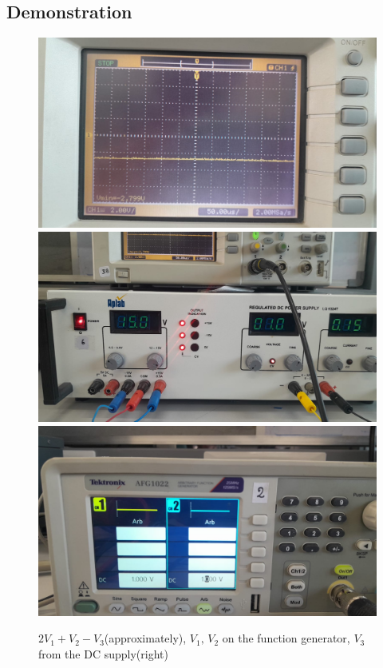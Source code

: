 \documentclass[a4paper,12pt]{article}
\begin{document}
\subsection{Demonstration}
\begin{figure}[H]
	\centering
	\includegraphics[width = 0.7\columnwidth]{figs/exp1f3.jpg}
	\includegraphics[width = 0.7\columnwidth]{figs/exp1f2.jpg}
	\includegraphics[width = 0.7\columnwidth]{figs/ex1f1.jpg}
	\caption{$2V_1+V_2-V_3$(approximately), $V_1,\,V_2$ on the function generator, $V_3$ from the DC supply(right)}
\end{figure}
\end{document}
